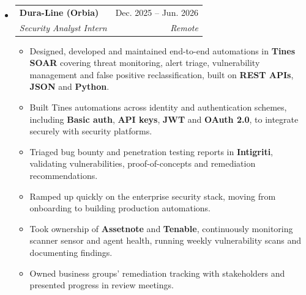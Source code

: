 \documentclass[a4paper,10pt]{article}
\makeatletter
\newcommand{\resumeItem}[1]{
  \item\small{
    {#1 \vspace{-2pt}}
  }
}
\newcommand{\resumeSubheading}[4]{
  \vspace{-2pt}\item
  \begin{tabular*}{0.97\textwidth}[t]{l@{\extracolsep{\fill}}r}
    \textbf{#1} & #2 \\
    \textit{\small#3} & \textit{\small #4} \\
  \end{tabular*}\vspace{-3pt}
}
\newenvironment{resumeSubHeadingList}{\begin{itemize}[leftmargin=0.15in, label={}]}{\end{itemize}}
\newenvironment{resumeItemList}{\begin{itemize}}{\end{itemize}}
\makeatother
\begin{document}
\begin{resumeSubHeadingList}
\begin{resumeItemList}
{                   \textbf{SQL} database, to retain automation data for
                   future reference and visualise daily and monthly metrics for
                   \textbf{compliance and audit}.}
      \resumeItem{Own quarterly \textbf{SAP} and \textbf{internet-facing} penetration tests on
                   \textbf{Intigriti} end to end, from cleaning scope and clearing backlog
                   vulnerabilities to closing reports with the \textbf{GRC} team,
                   performing retests to validate patches and variant analysis, and
                   reporting to business-group owners and stakeholders.}
      \resumeItem{Executed \textbf{2} white-box pentests on internal web apps and validated
                   remediation by retesting \textbf{8} internal applications.}
      \resumeItem{Mentored interns and juniors on building and handling automations;
                   wrote \textbf{runbooks} and \textbf{SOPs} for the workflows.}
    \end{resumeItemList}
    \vspace{2pt}

  \resumeSubheading
    {Dura-Line (Orbia)}{Dec. 2025 -- Jun. 2026}
    {Security Analyst Intern}{Remote}
    \begin{resumeItemList}
      \resumeItem{Designed, developed and maintained end-to-end
                   automations in \textbf{Tines SOAR} covering threat monitoring, alert
                   triage, vulnerability management and false positive
                   reclassification, built on \textbf{REST APIs}, \textbf{JSON} and \textbf{Python}.}
      \resumeItem{Built Tines automations across identity and authentication
                   schemes, including \textbf{Basic auth}, \textbf{API keys}, \textbf{JWT} and \textbf{OAuth 2.0},
                   to integrate securely with security platforms.}
      \resumeItem{Triaged bug bounty and penetration testing reports in
                   \textbf{Intigriti}, validating vulnerabilities, proof-of-concepts and
                   remediation recommendations.}
      \resumeItem{Ramped up quickly on the enterprise security stack, moving from
                   onboarding to building production automations.}
      \resumeItem{Took ownership of \textbf{Assetnote} and \textbf{Tenable}, continuously
                   monitoring scanner sensor and agent health, running weekly
                   vulnerability scans and documenting findings.}
      \resumeItem{Owned business groups' remediation tracking with stakeholders and
                   presented progress in review meetings.}
    \end{resumeItemList}
    \vspace{2pt}


\end{resumeSubHeadingList}
\end{document}
